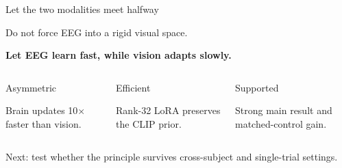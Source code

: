 \documentclass[aspectratio=169]{beamer}
\begin{document}
\begin{frame}{Let the two modalities meet halfway}
  \vspace{3pt}
  \begin{center}
    {\color{MidGray}\fontsize{13}{16}\selectfont
      Do not force EEG into a rigid visual space.
    \par}
    \vspace{4pt}
    {\color{HAIred}\bfseries\fontsize{21}{25}\selectfont
      Let EEG learn fast, while vision adapts slowly.
    \par}
  \end{center}

  \vspace{12pt}
  \begin{columns}[t,onlytextwidth]
      \begin{block}{\centering Asymmetric}
        \centering
        {\fontsize{11.5}{14}\selectfont
          Brain updates 10$\times$ faster than vision.
        \par}
      \end{block}

      \begin{exampleblock}{\centering Efficient}
        \centering
        {\fontsize{11.5}{14}\selectfont
          Rank-32 LoRA preserves the CLIP prior.
        \par}
      \end{exampleblock}

      \begin{alertblock}{\centering Supported}
        \centering
        {\fontsize{11.5}{14}\selectfont
          Strong main result and matched-control gain.
        \par}
      \end{alertblock}
  \end{columns}

  \vspace{7pt}
  \begin{center}
    {\color{MidGray}\fontsize{11}{14}\selectfont
      Next: test whether the principle survives cross-subject and single-trial settings.
    \par}
  \end{center}
\end{frame}
\end{document}
